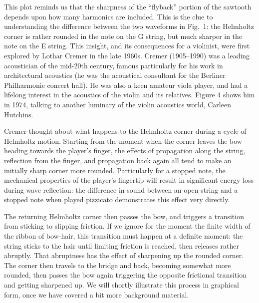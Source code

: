 
  This plot reminds us that the sharpness of the “flyback” portion of the 
  sawtooth depends upon how many harmonics are included. This is the clue to 
  understanding the difference between the two waveforms in Fig.\ 1: the 
  Helmholtz corner is rather rounded in the note on the G string, but much 
  sharper in the note on the E string. This insight, and its consequences for a 
  violinist, were first explored by Lothar Cremer in the late 1960s. Cremer 
  (1905--1990) was a leading acoustician of the mid-20th century, famous 
  particularly for his work in architectural acoustics (he was the acoustical 
  consultant for the Berliner Philharmonie concert hall). He was also a keen 
  amateur viola player, and had a lifelong interest in the acoustics of the 
  violin and its relatives. Figure 4 shows him in 1974, talking to another 
  luminary of the violin acoustics world, Carleen Hutchins. 


  Cremer thought about what happens to the Helmholtz corner during a cycle of 
  Helmholtz motion. Starting from the moment when the corner leaves the bow 
  heading towards the player’s finger, the effects of propagation along the 
  string, reflection from the finger, and propagation back again all tend to 
  make an initially sharp corner more rounded. Particularly for a stopped note, 
  the mechanical properties of the player’s fingertip will result in 
  significant energy loss during wave reflection: the difference in sound 
  between an open string and a stopped note when played pizzicato demonstrates 
  this effect very directly. 

  The returning Helmholtz corner then passes the bow, and triggers a transition 
  from sticking to slipping friction. If we ignore for the moment the finite 
  width of the ribbon of bow-hair, this transition must happen at a definite 
  moment: the string sticks to the hair until limiting friction is reached, 
  then releases rather abruptly. That abruptness has the effect of sharpening 
  up the rounded corner. The corner then travels to the bridge and back, 
  becoming somewhat more rounded, then passes the bow again triggering the 
  opposite frictional transition and getting sharpened up. We will shortly 
  illustrate this process in graphical form, once we have covered a bit more 
  background material. 

